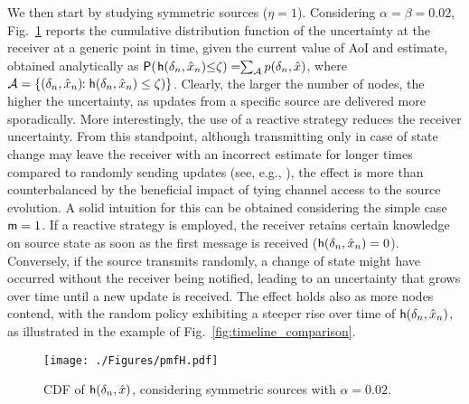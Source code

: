 We then start by studying symmetric sources ($\eta=1$). Considering $\alpha{=}\beta{=}0.02$, Fig.~\ref*{fig:pmfH} reports the cumulative distribution function of the uncertainty at the receiver at a generic point in time, given the current value of AoI and estimate, obtained analytically as $\mathsf P(\hspace{.1em}\mathsf h(\delta_n,\hat{x}_n){\leq} \zeta )= \!\!\sum_{\mathcal A} p(\delta_n,\hat{x})$, where \mbox{$\mathcal A = \{(\delta_n,\hat{x}_n) \!\!: \mathsf h(\delta_n,\hat{x}_n)\leq \zeta)\}$}.
Clearly, the larger the number of nodes, the higher the uncertainty, as updates from a specific source are delivered more sporadically. More interestingly, the use of a reactive strategy reduces the receiver uncertainty. From this standpoint, although transmitting only in case of state change may leave the receiver with an incorrect estimate for longer times compared to randomly sending updates (see, e.g., \cite{Munari24_ICC}), the effect is more than counterbalanced by the beneficial impact of tying channel access to the source evolution. A solid intuition for this can be obtained considering the simple case $\mathsf m=1$. If a reactive strategy is employed, the receiver retains certain knowledge on source state as soon as the first message is received ($\mathsf h(\delta_n,\hat{x}_n) = 0$). Conversely, if the source transmits randomly, a change of state might have occurred without the receiver being notified, leading to an uncertainty that grows over time until a new update is received. The effect holds also as more nodes contend, with the random policy exhibiting a steeper rise over time of $\mathsf h(\delta_n,\hat{x}_n)$, as illustrated in the example of Fig.~\ref{fig:timeline_comparison}.

\begin{figure}
    \centering
    \texttt{[image: ./Figures/pmfH.pdf]}
    \vspace{-1em}
    \caption{CDF of $\mathsf h(\delta_n,\hat{x})$, considering symmetric sources with $\alpha=0.02$.}
    \label{fig:pmfH}
    \vspace{-1em}
\end{figure}

